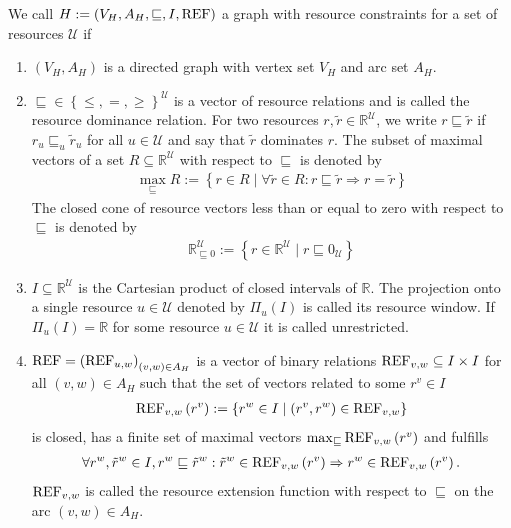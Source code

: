 \begin{definition}
\label{def:graph_resource_constraints}

We call ${H:=\left(V_H,A_H,\sqsubseteq,I,\operatorname{REF}\right)}$ a graph with resource constraints for a set of resources $\mathcal{U}$ if
\begin{enumerate}
	\item{$\left(V_H,A_H\right)$ is a directed graph with vertex set $V_H$ and arc set $A_H$.}
	\item{$\sqsubseteq\in\left\{\leq,=,\geq\right\}^{\mathcal{U}}$ is a vector of resource relations and is called the resource dominance relation.}
		For two resources ${r,\tilde{r}\in\mathbb{R}^{\mathcal{U}}}$, we write ${r\sqsubseteq\tilde{r}}$ if ${r_u\sqsubseteq_u \tilde{r}_u}$ for all $u\in\mathcal{U}$ and say that $\tilde{r}$ dominates $r$. The subset of maximal vectors of a set $R\subseteq\mathbb{R}^{\mathcal{U}}$ with respect to $\sqsubseteq$ is denoted by
		\begin{align*}
			\max_{\sqsubseteq} R := \left\{r\in R\mid \forall\tilde{r}\in R: r\sqsubseteq\tilde{r}\Rightarrow r=\tilde{r}\right\}
		\end{align*}
		The closed cone of resource vectors less than or equal to zero with respect to $\sqsubseteq$ is denoted by
		\begin{align*}
			\mathbb{R}^{\mathcal{U}}_{\sqsubseteq 0} := \left\{r\in\mathbb{R}^{\mathcal{U}}\mid r\sqsubseteq 0_{\mathcal{U}}\right\}
		\end{align*}
	\item{$I\subseteq\mathbb{R}^{\mathcal{U}}$ is the Cartesian product of closed intervals of $\mathbb{R}$.}
		The projection onto a single resource $u\in\mathcal{U}$ denoted by $\Pi_u(I)$ is called its resource window. If $\Pi_u(I)=\mathbb{R}$ for some resource $u\in\mathcal{U}$ it is called unrestricted.
	\item{$\operatorname{REF} = \left(\operatorname{REF}_{u,w}\right)_{(v,w)\in A_H}$}
		is a vector of binary relations ${\operatorname{REF}_{v,w}\subseteq I\times I}$ for all ${(v,w)\in A_H}$ such that the set of vectors related to some ${r^v\in I}$
		\begin{align*}
			\operatorname{REF}_{v,w}\left(r^v\right) := \left\{r^w\in I\mid \left(r^v,r^w\right)\in\operatorname{REF}_{v,w}\right\}
		\end{align*}
		is closed, has a finite set of maximal vectors ${\max_{\sqsubseteq}\operatorname{REF}_{v,w}\left(r^v\right)}$ and fulfills
		\begin{align*}
			\forall r^w,\tilde{r}^w\in I,r^w\sqsubseteq\tilde{r}^w : \tilde{r}^w\in\operatorname{REF}_{v,w}\left(r^v\right) \Rightarrow r^w\in\operatorname{REF}_{v,w}\left(r^v\right).
		\end{align*}
		$\operatorname{REF}_{v,w}$ is called the resource extension function with respect to $\sqsubseteq$ on the arc $(v,w)\in A_H$.
\end{enumerate}
	
\end{definition}

